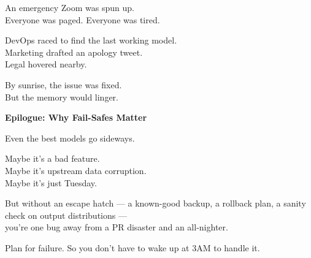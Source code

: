 An emergency Zoom was spun up.\\
Everyone was paged. Everyone was tired.

DevOps raced to find the last working model.\\
Marketing drafted an apology tweet.\\
Legal hovered nearby.

By sunrise, the issue was fixed.\\
But the memory would linger.

\vspace{1em}
\textbf{Epilogue: Why Fail-Safes Matter}

Even the best models go sideways.

Maybe it’s a bad feature.\\
Maybe it’s upstream data corruption.\\
Maybe it’s just Tuesday.

But without an escape hatch — a known-good backup, a rollback plan, a sanity check on output distributions —\\
you’re one bug away from a PR disaster and an all-nighter.

Plan for failure. So you don’t have to wake up at 3AM to handle it.
